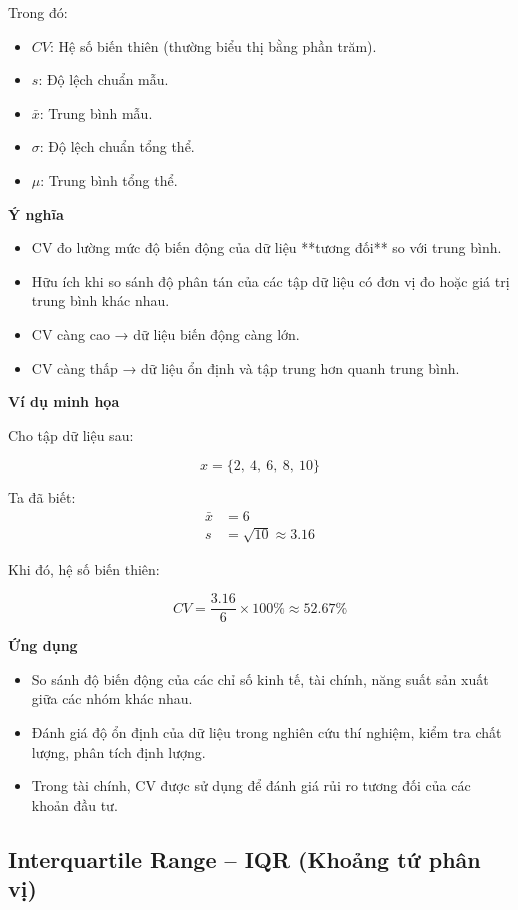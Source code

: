 Trong đó:
\begin{itemize}
    \item \( CV \): Hệ số biến thiên (thường biểu thị bằng phần trăm).
    \item \( s \): Độ lệch chuẩn mẫu.
    \item \( \bar{x} \): Trung bình mẫu.
    \item \( \sigma \): Độ lệch chuẩn tổng thể.
    \item \( \mu \): Trung bình tổng thể.
\end{itemize}

\textbf{Ý nghĩa}

\begin{itemize}
    \item CV đo lường mức độ biến động của dữ liệu **tương đối** so với trung bình.
    \item Hữu ích khi so sánh độ phân tán của các tập dữ liệu có đơn vị đo hoặc giá trị trung bình khác nhau.
    \item CV càng cao → dữ liệu biến động càng lớn.
    \item CV càng thấp → dữ liệu ổn định và tập trung hơn quanh trung bình.
\end{itemize}

\textbf{Ví dụ minh họa}

Cho tập dữ liệu sau:

\[
x = \{ 2,\ 4,\ 6,\ 8,\ 10 \}
\]

Ta đã biết:
\begin{align*}
\bar{x} &= 6 \\
s &= \sqrt{10} \approx 3.16
\end{align*}

Khi đó, hệ số biến thiên:

\[
CV = \frac{3.16}{6} \times 100\% \approx 52.67\%
\]

\textbf{Ứng dụng}

\begin{itemize}
    \item So sánh độ biến động của các chỉ số kinh tế, tài chính, năng suất sản xuất giữa các nhóm khác nhau.
    \item Đánh giá độ ổn định của dữ liệu trong nghiên cứu thí nghiệm, kiểm tra chất lượng, phân tích định lượng.
    \item Trong tài chính, CV được sử dụng để đánh giá rủi ro tương đối của các khoản đầu tư.
\end{itemize}

\subsection {Interquartile Range – IQR (Khoảng tứ phân vị)}
\label{stat:iqr}

